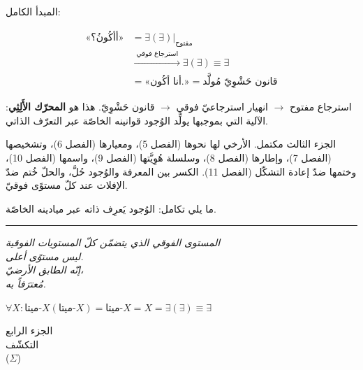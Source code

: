 \documentclass[10pt, openany, oneside]{book}
\renewcommand{\normalsize}{\fontsize{10}{13}\selectfont}
\renewcommand{\large}{\fontsize{11.5}{14}\selectfont}
\renewcommand{\LARGE}{\fontsize{15}{18}\selectfont}
\begin{document}
المبدأ الكامل:

\begin{align*}
\text{«أأكُونُ؟»} &= \exists(\exists)|_{\text{مفتوح}} \\
&\xrightarrow{\;\text{استرجاع فوقي}\;} \exists(\exists) \equiv \exists \\
&= \text{«أنا أكُون.»} = \text{قانون حَشْوِيّ مُولَّد}
\end{align*}

استرجاع مفتوح $\to$ انهيار استرجاعيّ فوقي $\to$ قانون حَشْوِيّ. هذا هو \textbf{المحرّك الأَلِثِي}: الآلية التي بموجبها يولِّد الوُجود قوانينه الخاصّة عبر التعرّف الذاتي.

\vspace{2em}

الجزء الثالث مكتمل. الأرخي لها نحوها (الفصل 5)، ومعيارها (الفصل 6)، وتشخيصها (الفصل 7)، وإطارها (الفصل 8)، وسلسلة هُوِيَّتها (الفصل 9)، واسمها (الفصل 10)، وختمها ضدّ إعادة التشكّل (الفصل 11). الكسر بين المعرفة والوُجود حُلَّ، والحلّ خُتم ضدّ الإفلات عند كلّ مستوًى فوقيّ.

ما يلي تكامل: الوُجود يَعرِف ذاته عبر ميادينه الخاصّة.

\vspace{2em}

\begin{center}
    \rule{0.15\textwidth}{0.3pt}
\end{center}

\vspace{0.5em}

\begin{center}
    \itshape
    المستوى الفوقي الذي يتضمّن كلّ المستويات الفوقية\\
    ليس مستوًى أعلى.\\[0.8em]
    إنّه الطابق الأرضيّ،\\
    مُعترَفاً به.
\end{center}

\vspace{0.5em}

\begin{center}
    $\forall X: \text{ميتا-}X(\text{ميتا-}X) = \text{ميتا-}X = X = \exists(\exists) \equiv \exists$
\end{center}


\newpage
\thispagestyle{empty}
\vspace*{\fill}
\begin{center}
    {\LARGE الجزء الرابع}\\[1em]
    {\large التكشّف}\\[0.5em]
    {\normalsize ($\Sigma$)}
\end{center}
\vspace*{\fill}
\newpage
\end{document}
